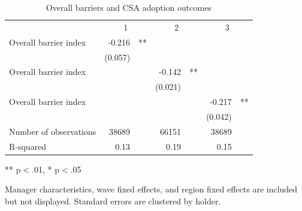 \begin{table}[!h]
\caption{Overall barriers and CSA adoption outcomes}
\centering
\begin{tabular}{lllllll}
\cline{1-7}
\multicolumn{1}{r}{} &
  \multicolumn{2}{c}{1} &
  \multicolumn{2}{c}{2} &
  \multicolumn{2}{c}{3} \\
\cline{1-7}
\multicolumn{1}{l}{Overall barrier index} &
  \multicolumn{1}{r}{-0.216} &
  \multicolumn{1}{l}{**} &
  \multicolumn{1}{r}{} &
  \multicolumn{1}{l}{} &
  \multicolumn{1}{r}{} &
  \multicolumn{1}{l}{} \\
\multicolumn{1}{l}{} &
  \multicolumn{1}{r}{(0.057)} &
  \multicolumn{1}{l}{} &
  \multicolumn{1}{r}{} &
  \multicolumn{1}{l}{} &
  \multicolumn{1}{r}{} &
  \multicolumn{1}{l}{} \\
\multicolumn{1}{l}{Overall barrier index} &
  \multicolumn{1}{r}{} &
  \multicolumn{1}{l}{} &
  \multicolumn{1}{r}{-0.142} &
  \multicolumn{1}{l}{**} &
  \multicolumn{1}{r}{} &
  \multicolumn{1}{l}{} \\
\multicolumn{1}{l}{} &
  \multicolumn{1}{r}{} &
  \multicolumn{1}{l}{} &
  \multicolumn{1}{r}{(0.021)} &
  \multicolumn{1}{l}{} &
  \multicolumn{1}{r}{} &
  \multicolumn{1}{l}{} \\
\multicolumn{1}{l}{Overall barrier index} &
  \multicolumn{1}{r}{} &
  \multicolumn{1}{l}{} &
  \multicolumn{1}{r}{} &
  \multicolumn{1}{l}{} &
  \multicolumn{1}{r}{-0.217} &
  \multicolumn{1}{l}{**} \\
\multicolumn{1}{l}{} &
  \multicolumn{1}{r}{} &
  \multicolumn{1}{l}{} &
  \multicolumn{1}{r}{} &
  \multicolumn{1}{l}{} &
  \multicolumn{1}{r}{(0.042)} &
  \multicolumn{1}{l}{} \\
\multicolumn{1}{l}{Number of observations} &
  \multicolumn{1}{r}{38689} &
  \multicolumn{1}{l}{} &
  \multicolumn{1}{r}{66151} &
  \multicolumn{1}{l}{} &
  \multicolumn{1}{r}{38689} &
  \multicolumn{1}{l}{} \\
\multicolumn{1}{l}{R-squared} &
  \multicolumn{1}{r}{0.13} &
  \multicolumn{1}{l}{} &
  \multicolumn{1}{r}{0.19} &
  \multicolumn{1}{l}{} &
  \multicolumn{1}{r}{0.15} &
  \multicolumn{1}{l}{} \\
\cline{1-7}
\end{tabular}

\footnotesize{
** p$<$.01, * p$<$.05

Manager characteristics, wave fixed effects, and region fixed effects are included but not displayed. Standard errors are clustered by holder.
}
\end{table}
